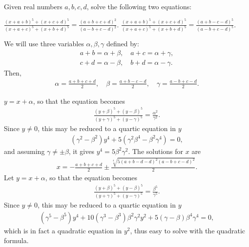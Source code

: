 \documentclass[12pt,a4paper]{memoir}
\theoremstyle{definition}
\begin{document}
\begin{question}
	Given real numbers $a,b,c,d$, solve the following two equations:
	\begin{tasks}
		\task $\displaystyle \frac{(x+a+b)^5+(x+c+d)^5}{(x+a+c)^5+(x+b+d)^5} = \frac{(a+b+c+d)^2}{(a-b+c-d)^2}$.
		\task $\displaystyle  \frac{(x+a+b)^5+(x+c+d)^5}{(x+a+c)^5+(x+b+d)^5} = \frac{(a+b-c-d)^5}{(a-b+c-d)^5}$.
	\end{tasks}
\end{question}

\begin{solution}
	We will use three variables $\alpha, \beta, \gamma$ defined by:
	\begin{align*}
		a+b=\alpha+\beta, \quad a+c=\alpha+\gamma,\\
		c+d=\alpha-\beta, \quad b+d=\alpha-\gamma.
	\end{align*}
	Then,
	\begin{align*}
		\alpha = \frac{a+b+c+d}{2}, \quad \beta=\frac{a+b-c-d}{2}, \quad \gamma=\frac{a-b+c-d}{2}.
	\end{align*}
	\begin{tasks}
		\task $y=x+\alpha$, so that the equation becomes
		\begin{align*}
			\frac{(y+\beta)^5+(y-\beta)^5}{(y+\gamma)^5+(y-\gamma)^5}=\frac{\alpha^2}{\gamma^2}.
		\end{align*}
		Since $y\neq 0$, this may be reduced to a quartic equation in $y$
		\begin{align*}
			(\gamma^2-\beta^2)y^4 + 5(\gamma^2\beta^4-\beta^2\gamma^4)=0,
		\end{align*}
		and assuming $\gamma \neq \pm \beta$, it gives $y^4=5\beta^2\gamma^2$. The solutions for $x$ are
		\begin{align*}
			x=-\frac{a+b+c+d}{2}\pm\frac{\sqrt[4]{5(a+b-d-d)^2(a-b+c-d)^2}}{2}.
		\end{align*}
		\task Let $y=x+\alpha$, so that the equation becomes
		\begin{align*}
			\frac{(y+\beta)^5+(y-\beta)^5}{(y+\gamma)^5+(y-\gamma)^5}=\frac{\beta^5}{\gamma^5}.
		\end{align*}
		Since $y\neq 0$, this may be reduced to a quartic equation in $y$
		\begin{align*}
			(\gamma^5-\beta^5)y^4 + 10(\gamma^3-\beta^3)\beta^2\gamma^2y^2+5(\gamma-\beta)\beta^4\gamma^4=0,
		\end{align*}
		which is in fact a quadratic equation in $y^2$, thus easy to solve with the quadratic formula.
	\end{tasks}
\end{solution}
\end{document}
